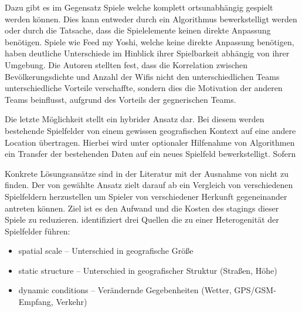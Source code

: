 Dazu gibt es im Gegensatz Spiele welche komplett ortsunabhängig gespielt werden können.
Dies kann entweder durch ein Algorithmus bewerkstelligt werden oder durch die Tatsache, dass die Spielelemente keinen direkte Anpassung benötigen.
Spiele wie Feed my Yoshi, welche keine direkte Anpassung benötigen, haben deutliche Unterschiede im Hinblick ihrer Spielbarkeit abhängig von ihrer Umgebung. Die Autoren stellten fest, dass die Korrelation zwischen Bevölkerungsdichte und Anzahl der Wifis nicht den unterschiedlichen Teams unterschiedliche Vorteile verschaffte, sondern dies die Motivation der anderen Teams beinflusst, aufgrund des Vorteils der gegnerischen Teams.

Die letzte Möglichkeit stellt ein hybrider Ansatz dar. Bei diesem werden bestehende Spielfelder von einem gewissen geografischen Kontext auf eine andere Location übertragen. Hierbei wird unter optionaler Hilfenahme von Algorithmen ein Transfer der bestehenden Daten auf ein neues Spielfeld bewerkstelligt. Sofern

Konkrete Lösungsansätze sind in der Literatur mit der Ausnahme von \cite{Kiefer.2007}
nicht zu finden.
Der von \cite{Kiefer.2007} gewählte Ansatz zielt darauf ab ein Vergleich von verschiedenen Spielfeldern herzustellen um Spieler von verschiedener Herkunft gegeneinander antreten können. Ziel ist es den Aufwand und die Kosten des stagings dieser Spiele zu reduzieren. \citep{Kiefer.2007} identifiziert drei Quellen die zu einer Heterogenität der Spielfelder führen:

\begin{itemize}
\item spatial scale -- Unterschied in geografische Größe
\item static structure -- Unterschied in geografischer Struktur (Straßen, Höhe) 
\item dynamic conditions -- Verändernde Gegebenheiten (Wetter, GPS/GSM-Empfang, Verkehr)
\end{itemize}

